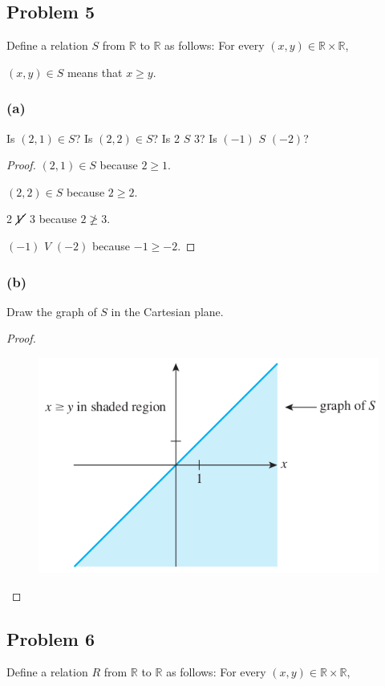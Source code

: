 \documentclass[14pt]{extarticle}
\newcommand{\R}{\mathbb{R}}
\begin{document}
\subsection{Problem 5}
Define a relation $S$ from $\R$ to $\R$ as follows:
For every $(x, y) \in \R \times \R$,

\begin{center}
$(x, y) \in S$ means that $x \geq y$.
\end{center}

\subsubsection{(a)}
Is $(2, 1) \in S$? Is $(2, 2) \in S$? Is 2 $S$ 3? Is $(-1)$ $S$ $(-2)$?

\begin{proof}
$(2, 1) \in S$ because $2 \geq 1$.

$(2, 2) \in S$ because $2 \geq 2$.

2 $\cancel{V}$ 3 because $2 \ngeq 3$.

$(-1)$ $V$ $(-2)$ because $-1 \geq -2$.
\end{proof}

\subsubsection{(b)}
Draw the graph of $S$ in the Cartesian plane.

\begin{proof}
\begin{figure}[ht!]
\centering
\includegraphics[scale=0.5]{../images/1.3.5.png}
\end{figure}
\end{proof}

\subsection{Problem 6}
Define a relation $R$ from $\R$ to $\R$ as follows:
For every $(x, y) \in \R \times \R$,
\end{document}
